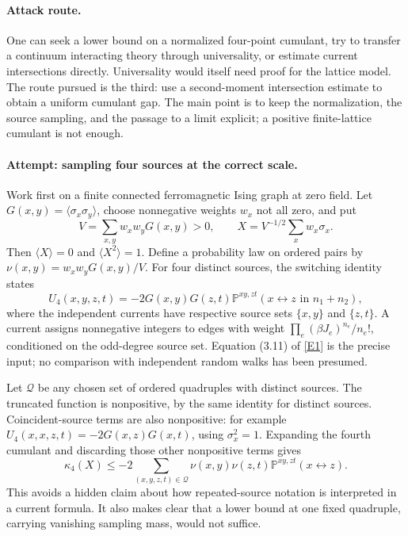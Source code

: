 \documentclass[11pt,a4paper]{article}
\numberwithin{equation}{section}
\newcommand{\eref}[2]{\hyperlink{extra:#1:#2}{[E#2]}}
\begin{document}
\paragraph{Attack route.}
One can seek a lower bound on a normalized four-point cumulant, try to
transfer a continuum interacting theory through universality, or estimate
current intersections directly. Universality would itself need proof for
the lattice model. The route pursued is the third: use a second-moment
intersection estimate to obtain a uniform cumulant gap. The main point is
to keep the normalization, the source sampling, and the passage to a limit
explicit; a positive finite-lattice cumulant is not enough.

\paragraph{Attempt: sampling four sources at the correct scale.}
Work first on a finite connected ferromagnetic Ising graph at zero field.
Let $G(x,y)=\langle\sigma_x\sigma_y\rangle$, choose nonnegative weights
$w_x$ not all zero, and put
\[
 V=\sum_{x,y}w_xw_yG(x,y)>0,
 \qquad X=V^{-1/2}\sum_xw_x\sigma_x.
\]
Then $\langle X\rangle=0$ and $\langle X^2\rangle=1$. Define a probability
law on ordered pairs by
$\nu(x,y)=w_xw_yG(x,y)/V$.
For four distinct sources, the switching identity states
\begin{equation}\label{eq73:current}
 U_4(x,y,z,t)=-2G(x,y)G(z,t)
   \mathbb P^{xy,zt}(x\leftrightarrow z\text{ in }n_1+n_2),
\end{equation}
where the independent currents have respective source sets $\{x,y\}$ and
$\{z,t\}$. A current assigns nonnegative integers to edges with weight
$\prod_e(\beta J_e)^{n_e}/n_e!$, conditioned on the odd-degree source set.
Equation (3.11) of \eref{30006710}{1} is the precise input; no comparison with
independent random walks has been presumed.

Let $\mathcal Q$ be any chosen set of ordered quadruples with distinct
sources. The truncated function is nonpositive, by the same identity for
distinct sources. Coincident-source terms are also nonpositive: for example
$U_4(x,x,z,t)=-2G(x,z)G(x,t)$, using $\sigma_x^2=1$.
Expanding the fourth cumulant and discarding those other nonpositive terms
gives
\begin{equation}\label{eq73:weighted}
 \kappa_4(X)\leq-2\sum_{(x,y,z,t)\in\mathcal Q}
       \nu(x,y)\nu(z,t)
       \mathbb P^{xy,zt}(x\leftrightarrow z).
\end{equation}
This avoids a hidden claim about how repeated-source notation is interpreted
in a current formula. It also makes clear that a lower bound at one fixed
quadruple, carrying vanishing sampling mass, would not suffice.
\end{document}

